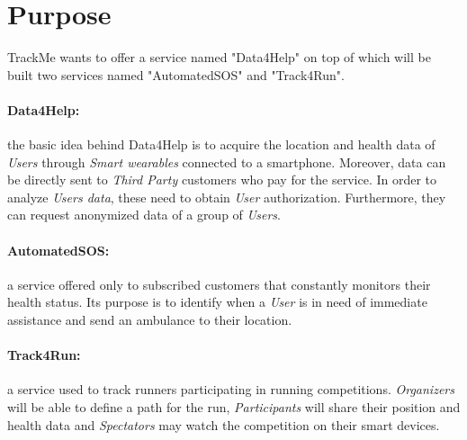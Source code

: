 \documentclass[../../rasd.tex]{subfiles}
\begin{document}
\section{Purpose}
			
			TrackMe wants to offer a service named "Data4Help" on top of which will be built two services named "AutomatedSOS" and "Track4Run".
			\paragraph{Data4Help:} the basic idea behind Data4Help is to acquire the location and health data of \textit{Users} through \textit{Smart wearables} connected to a smartphone. Moreover, data can be directly sent to \textit{Third Party} customers who pay for the service. In order to analyze \textit{Users data}, these need to obtain \textit{User} authorization. Furthermore, they can request anonymized data of a group of \textit{Users}.
			
			\paragraph{AutomatedSOS:} a service offered only to subscribed customers that constantly monitors their health status. Its purpose is to identify when a \textit{User} is in need of immediate assistance and send an ambulance to their location.
			
			\paragraph{Track4Run:} a service used to track runners participating in running competitions. \textit{Organizers} will be able to define a path for the run, \textit{Participants} will share their position and health data and \textit{Spectators} may watch the competition on their smart devices.
\end{document}
